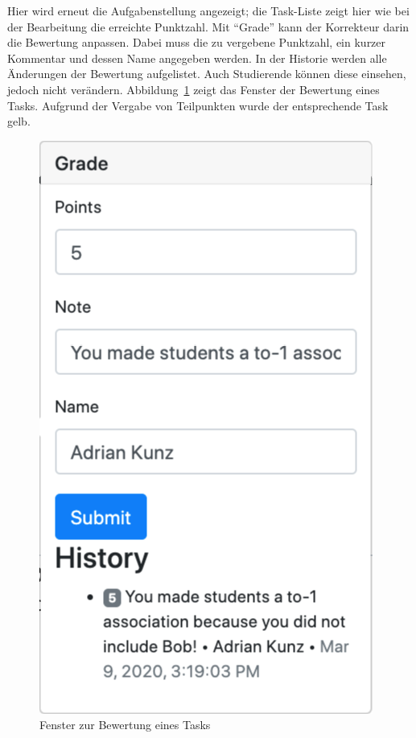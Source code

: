 Hier wird erneut die Aufgabenstellung angezeigt;
die Task-Liste zeigt hier wie bei der Bearbeitung die erreichte Punktzahl.
Mit ``Grade'' kann der Korrekteur darin die Bewertung anpassen.
Dabei muss die zu vergebene Punktzahl, ein kurzer Kommentar und dessen Name angegeben werden.
In der Historie werden alle Änderungen der Bewertung aufgelistet.
Auch Studierende können diese einsehen, jedoch nicht verändern.
Abbildung~\ref{fig:grade-popover} zeigt das Fenster der Bewertung eines Tasks.
Aufgrund der Vergabe von Teilpunkten wurde der entsprechende Task gelb.

\begin{figure}
    \centering
    \includegraphics[width=\textwidth]{chapter/fulib.org/img/grade-popover.png}
    \caption{Fenster zur Bewertung eines Tasks}
    \label{fig:grade-popover}
\end{figure}

